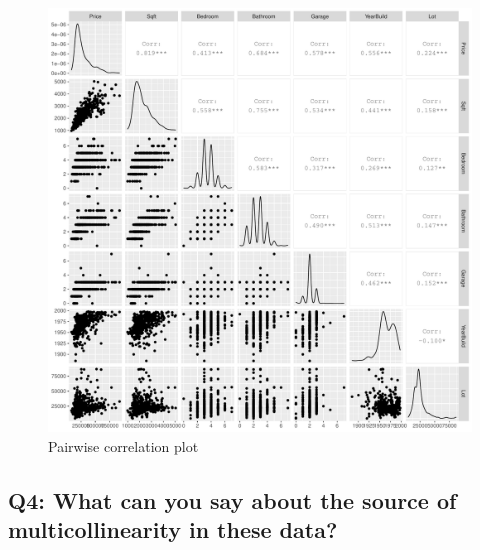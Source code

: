 \documentclass[]{article}
\newenvironment{Shaded}{\begin{snugshade}}{\end{snugshade}}
\newcommand{\DecValTok}[1]{\textcolor[rgb]{0.00,0.00,0.81}{#1}}
\newcommand{\KeywordTok}[1]{\textcolor[rgb]{0.13,0.29,0.53}{\textbf{#1}}}
\newcommand{\NormalTok}[1]{#1}
\newcommand{\OperatorTok}[1]{\textcolor[rgb]{0.81,0.36,0.00}{\textbf{#1}}}
\newcommand{\StringTok}[1]{\textcolor[rgb]{0.31,0.60,0.02}{#1}}
\begin{document}
\begin{figure}
\centering
\includegraphics{multicollinearity_questions_files/figure-latex/unnamed-chunk-5-1.pdf}
\caption{Pairwise correlation plot}
\end{figure}

\newpage

\hypertarget{q4-what-can-you-say-about-the-source-of-multicollinearity-in-these-data}{%
\subsection{Q4: What can you say about the source of multicollinearity
in these
data?}\label{q4-what-can-you-say-about-the-source-of-multicollinearity-in-these-data}}

\begin{Shaded}
\end{Shaded}
\end{document}

